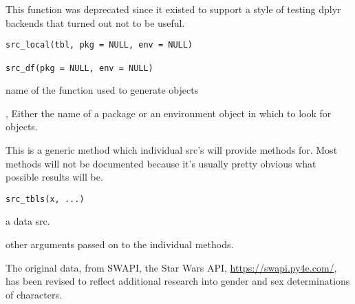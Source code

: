 \documentclass[a4paper]{book}
\begin{document}
%
\begin{Description}
\strong{[Deprecated]}
This function was deprecated since it existed to support a style of testing
dplyr backends that turned out not to be useful.
\end{Description}
%
\begin{Usage}
\begin{verbatim}
src_local(tbl, pkg = NULL, env = NULL)

src_df(pkg = NULL, env = NULL)
\end{verbatim}
\end{Usage}
%
\begin{Arguments}
\begin{ldescription}
\item[\code{tbl}] name of the function used to generate  objects

\item[\code{pkg}, \code{env}] Either the name of a package or an environment object in
which to look for objects.
\end{ldescription}
\end{Arguments}
%
\begin{Description}
This is a generic method which individual src's will provide methods for.
Most methods will not be documented because it's usually pretty obvious what
possible results will be.
\end{Description}
%
\begin{Usage}
\begin{verbatim}
src_tbls(x, ...)
\end{verbatim}
\end{Usage}
%
\begin{Arguments}
\begin{ldescription}
\item[\code{x}] a data src.

\item[\code{...}] other arguments passed on to the individual methods.
\end{ldescription}
\end{Arguments}
%
\begin{Description}
The original data, from SWAPI, the Star Wars API, \url{https://swapi.py4e.com/}, has been revised
to reflect additional research into gender and sex determinations of characters.
\end{Description}
\end{document}
